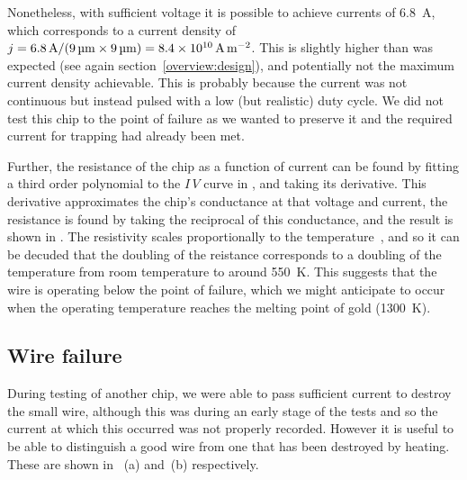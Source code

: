 Nonetheless, with sufficient voltage it is possible to achieve currents of
\SI{6.8}{\ampere}, which  corresponds to a current density of
$j=\SI{6.8}{\ampere}/(\SI{9}{\micro\meter}\times\SI{9}{\micro\meter})=
\SI{8.4E10}{\ampere\per\meter\squared}$. This is slightly higher than was
expected (see again section~\ref{overview:design}), and potentially not the
maximum current density achievable. This is probably because the current was
not continuous but instead pulsed with a low (but realistic) duty cycle. We did
not test this chip to the point of failure as we wanted to preserve it and the
required current for trapping had already been met.

Further, the resistance of the chip as a function of current can be found by
fitting a third order polynomial to the $I\,V$ curve in
, and taking its derivative. This derivative
approximates the chip's conductance at that voltage and current, the resistance
is found by taking the reciprocal of this conductance, and the result is shown
in . The resistivity scales proportionally to
the temperature~\cite{}, and so it can be decuded that the doubling of the
reistance corresponds to a doubling of the temperature from room temperature to
around \SI{550}{\kelvin}.  This suggests that the wire is operating below the
point of failure, which we might anticipate to occur when the operating
temperature reaches the melting point of gold (\SI{1300}{\kelvin}).

\subsection{Wire failure}

During testing of another chip, we were able to pass sufficient current to
destroy the small wire, although this was during an early stage of the tests
and so the current at which this occurred was not properly recorded. However it
is useful to be able to distinguish a good wire from one that has been
destroyed by heating. These are shown in ~(a)
and~(b) respectively.


